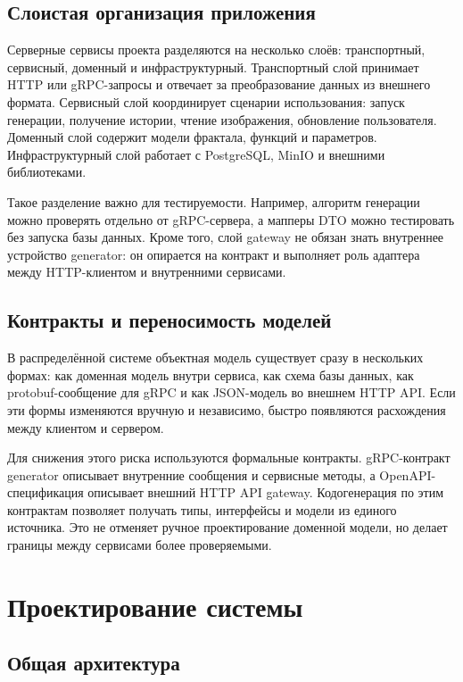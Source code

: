 \subsection{Слоистая организация приложения}

Серверные сервисы проекта разделяются на несколько слоёв: транспортный, сервисный, доменный и инфраструктурный. Транспортный слой принимает HTTP или gRPC-запросы и отвечает за преобразование данных из внешнего формата. Сервисный слой координирует сценарии использования: запуск генерации, получение истории, чтение изображения, обновление пользователя. Доменный слой содержит модели фрактала, функций и параметров. Инфраструктурный слой работает с PostgreSQL, MinIO и внешними библиотеками.

Такое разделение важно для тестируемости. Например, алгоритм генерации можно проверять отдельно от gRPC-сервера, а мапперы DTO можно тестировать без запуска базы данных. Кроме того, слой gateway не обязан знать внутреннее устройство generator: он опирается на контракт и выполняет роль адаптера между HTTP-клиентом и внутренними сервисами.

\subsection{Контракты и переносимость моделей}

В распределённой системе объектная модель существует сразу в нескольких формах: как доменная модель внутри сервиса, как схема базы данных, как protobuf-сообщение для gRPC и как JSON-модель во внешнем HTTP API. Если эти формы изменяются вручную и независимо, быстро появляются расхождения между клиентом и сервером.

Для снижения этого риска используются формальные контракты. gRPC-контракт generator описывает внутренние сообщения и сервисные методы, а OpenAPI-спецификация описывает внешний HTTP API gateway. Кодогенерация по этим контрактам позволяет получать типы, интерфейсы и модели из единого источника. Это не отменяет ручное проектирование доменной модели, но делает границы между сервисами более проверяемыми.

\newpage

\section{Проектирование системы}

\subsection{Общая архитектура}

